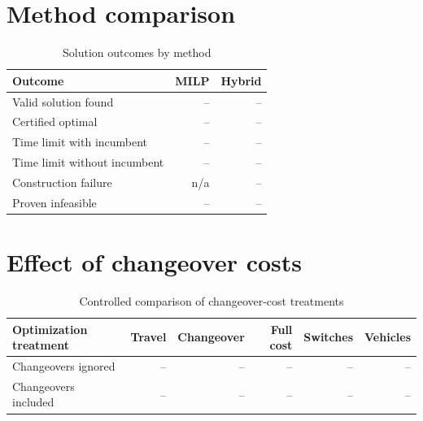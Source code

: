 \section{Method comparison}\label{sec:method-comparison}

\begin{table}[H]
  \centering
  \caption{Solution outcomes by method}
  \label{tab:method-outcomes}
  \begin{tabular}{@{}lrr@{}}
    \toprule
    Outcome & MILP & Hybrid \\
    \midrule
    Valid solution found & -- & -- \\
    Certified optimal & -- & -- \\
    Time limit with incumbent & -- & -- \\
    Time limit without incumbent & -- & -- \\
    Construction failure & n/a & -- \\
    Proven infeasible & -- & -- \\
    \bottomrule
  \end{tabular}
\end{table}


\section{Effect of changeover costs}\label{sec:changeover-effect}

\begin{table}[H]
  \centering
  \caption{Controlled comparison of changeover-cost treatments}
  \label{tab:changeover-comparison}
  \begin{tabularx}{\textwidth}{@{}Xrrrrr@{}}
    \toprule
    Optimization treatment & Travel & Changeover & Full cost & Switches & Vehicles \\
    \midrule
    Changeovers ignored & -- & -- & -- & -- & -- \\
    Changeovers included & -- & -- & -- & -- & -- \\
    \bottomrule
  \end{tabularx}
\end{table}

